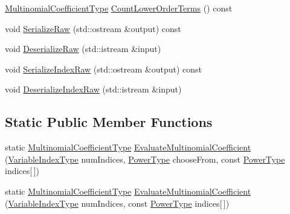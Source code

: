 \begin{DoxyCompactItemize}
\item 
\hyperlink{classnmr_polynomial_term_power_index_a09f482da776cfb829e26ad1fb381ab94}{Multinomial\-Coefficient\-Type} \hyperlink{classnmr_polynomial_term_power_index_a00c963b24985cd807343d187d6eb06c1}{Count\-Lower\-Order\-Terms} () const 
\item 
void \hyperlink{classnmr_polynomial_term_power_index_a5030f6067b58ac04f22153df1361e5db}{Serialize\-Raw} (std\-::ostream \&output) const 
\item 
void \hyperlink{classnmr_polynomial_term_power_index_a613c587165babcaf39d0b1258d57a226}{Deserialize\-Raw} (std\-::istream \&input)
\item 
void \hyperlink{classnmr_polynomial_term_power_index_ad70d8491c72c723c52d6ee09d54755b8}{Serialize\-Index\-Raw} (std\-::ostream \&output) const 
\item 
void \hyperlink{classnmr_polynomial_term_power_index_ae80206421efe7d48c9b7a63c3e29c477}{Deserialize\-Index\-Raw} (std\-::istream \&input)
\end{DoxyCompactItemize}
\subsection*{Static Public Member Functions}
\begin{DoxyCompactItemize}
\item 
static \hyperlink{classnmr_polynomial_term_power_index_a09f482da776cfb829e26ad1fb381ab94}{Multinomial\-Coefficient\-Type} \hyperlink{classnmr_polynomial_term_power_index_a827051ab88ffb5305c6090ace6988a4f}{Evaluate\-Multinomial\-Coefficient} (\hyperlink{classnmr_polynomial_term_power_index_ac982d5f82c3a95968e92d54c92cbc3e0}{Variable\-Index\-Type} num\-Indices, \hyperlink{classnmr_polynomial_term_power_index_a2eec01c3a2c3f56f47982ceffd8e36ed}{Power\-Type} choose\-From, const \hyperlink{classnmr_polynomial_term_power_index_a2eec01c3a2c3f56f47982ceffd8e36ed}{Power\-Type} indices\mbox{[}$\,$\mbox{]})
\item 
static \hyperlink{classnmr_polynomial_term_power_index_a09f482da776cfb829e26ad1fb381ab94}{Multinomial\-Coefficient\-Type} \hyperlink{classnmr_polynomial_term_power_index_af9e1b36b14be507248d9c47571508c20}{Evaluate\-Multinomial\-Coefficient} (\hyperlink{classnmr_polynomial_term_power_index_ac982d5f82c3a95968e92d54c92cbc3e0}{Variable\-Index\-Type} num\-Indices, const \hyperlink{classnmr_polynomial_term_power_index_a2eec01c3a2c3f56f47982ceffd8e36ed}{Power\-Type} indices\mbox{[}$\,$\mbox{]})
\end{DoxyCompactItemize}
